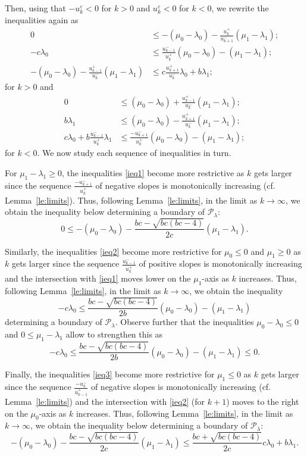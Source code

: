 \documentclass{amsart}
\numberwithin{theorem}{section}
\newcommand{\cP}{\mathcal{P}}
\begin{document}
  Then, using that $-u_k^\varepsilon<0$ for $k>0$ and $u_k^\varepsilon<0$ for $k<0$, we rewrite the inequalities again as
  \begin{align}
    \label{ieq1} 0 & \le -(\mu_0-\lambda_0)-\frac{u_k^+}{u_{k+1}^-}(\mu_1-\lambda_1);\\
    \label{ieq2} -c\lambda_0 & \le \frac{u_{k-1}^-}{u_k^+}(\mu_0-\lambda_0)-(\mu_1-\lambda_1);\\
    \label{ieq3} -(\mu_0-\lambda_0)-\frac{u_{k-1}^+}{u_k^-}(\mu_1-\lambda_1) &\le c\frac{u_{k+1}^+}{u_k^-}\lambda_0+b\lambda_1;
  \end{align}
  for $k>0$ and
  \begin{align}
    \label{ieq4} 0 &\le (\mu_0-\lambda_0)+\frac{u_{k-1}^+}{u_k^-}(\mu_1-\lambda_1);\\
    \label{ieq5} b\lambda_1 &\le (\mu_0-\lambda_0)-\frac{u_{k+1}^+}{u_k^-}(\mu_1-\lambda_1);\\
    \label{ieq6} c\lambda_0+b\frac{u_{k-1}^-}{u_k^+}\lambda_1 &\le \frac{-u_{k+1}^-}{u_k^+}(\mu_0-\lambda_0)-(\mu_1-\lambda_1);
  \end{align}
  for $k<0$.
  We now study each sequence of inequalities in turn.

  For $\mu_1-\lambda_1\ge 0$, the inequalities \eqref{ieq1} become more restrictive as $k$ gets larger since the sequence $\frac{-u_{k+1}^-}{u_k^+}$ of negative slopes is monotonically increasing (cf. Lemma~\ref{le:limits}).
  Thus, following Lemma~\ref{le:limits}, in the limit as $k\to\infty$, we obtain the inequality below determining a boundary of $\cP_\lambda$:
  \[ 0 \le -(\mu_0-\lambda_0)-\frac{bc-\sqrt{bc(bc-4)}}{2c}(\mu_1-\lambda_1). \]

  Similarly, the inequalities \eqref{ieq2} become more restrictive for $\mu_0\le0$ and $\mu_1\ge0$ as $k$ gets larger since the sequence $\frac{u_{k-1}^-}{u_k^+}$ of positive slopes is monotonically increasing and the intersection with \eqref{ieq1} moves lower on the $\mu_1$-axis as $k$ increases.
  Thus, following Lemma~\ref{le:limits}, in the limit as $k\to\infty$, we obtain the inequality
  \[ -c\lambda_0 \le \frac{bc-\sqrt{bc(bc-4)}}{2b}(\mu_0-\lambda_0)-(\mu_1-\lambda_1) \]
  determining a boundary of $\cP_\lambda$.
  Observe further that the inequalities $\mu_0-\lambda_0 \le 0$ and $0 \le \mu_1-\lambda_1$ allow to strengthen this as
  \[ -c\lambda_0 \le \frac{bc-\sqrt{bc(bc-4)}}{2b}(\mu_0-\lambda_0)-(\mu_1-\lambda_1) \le 0. \]

  Finally, the inequalities \eqref{ieq3} become more restrictive for $\mu_1\le0$ as $k$ gets larger since the sequence $\frac{-u_k^-}{u_{k-1}^+}$ of negative slopes is monotonically increasing (cf. Lemma~\ref{le:limits}) and the intersection with \eqref{ieq2} (for $k+1$) moves to the right on the $\mu_0$-axis as $k$ increases.
  Thus, following Lemma~\ref{le:limits}, in the limit as $k\to\infty$, we obtain the inequality below determining a boundary of $\cP_\lambda$:
  \[ -(\mu_0-\lambda_0)-\frac{bc-\sqrt{bc(bc-4)}}{2c}(\mu_1-\lambda_1) \le \frac{bc+\sqrt{bc(bc-4)}}{2c}c\lambda_0+b\lambda_1. \]
\end{document}
